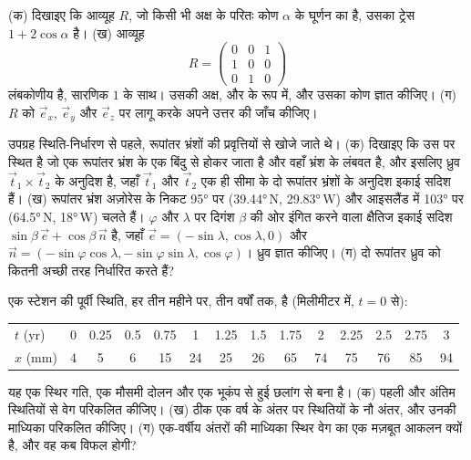 \begin{exercise}[$\star\star\star$]\label{exo:b1:plate-kinematics:10}
(क) दिखाइए कि आव्यूह $R$, जो किसी भी अक्ष के परितः कोण $\alpha$ के घूर्णन का है, उसका ट्रेस $1 + 2\cos\alpha$ है। (ख) आव्यूह
\[
  R = \begin{pmatrix} 0 & 0 & 1\\ 1 & 0 & 0\\ 0 & 1 & 0\end{pmatrix}
\]
लंबकोणीय है, सारणिक $1$ के साथ। उसकी अक्ष,  और  के रूप में, और उसका कोण ज्ञात कीजिए। (ग) $R$ को $\vec e_x$, $\vec e_y$
और $\vec e_z$ पर लागू करके अपने उत्तर की जाँच कीजिए।
\end{exercise}

\begin{exercise}[$\star\star\star$]\label{exo:b1:plate-kinematics:11}
उपग्रह स्थिति-निर्धारण से पहले,  रूपांतर भ्रंशों की प्रवृत्तियों से खोजे जाते थे। (क) दिखाइए कि  उस  पर स्थित है जो एक रूपांतर भ्रंश के एक बिंदु से होकर जाता है और वहाँ भ्रंश के लंबवत है, और इसलिए ध्रुव $\vec t_1\times\vec t_2$ के अनुदिश है, जहाँ $\vec t_1$ और $\vec t_2$ एक ही सीमा के दो रूपांतर भ्रंशों के अनुदिश इकाई सदिश हैं। (ख) रूपांतर भ्रंश अज़ोरेस  के निकट \ang{95} पर (\ang{39.44}\,N, \ang{29.83}\,W) और आइसलैंड में \ang{103} पर (\ang{64.5}\,N, \ang{18}\,W) चलते हैं।  $\varphi$ और  $\lambda$ पर दिगंश $\beta$ की ओर इंगित करने वाला क्षैतिज इकाई सदिश $\sin\beta\,\vec e +
\cos\beta\,\vec n$ है, जहाँ $\vec e = (-\sin\lambda, \cos\lambda, 0)$ और $\vec n =
(-\sin\varphi\cos\lambda, -\sin\varphi\sin\lambda, \cos\varphi)$। ध्रुव ज्ञात कीजिए। (ग) दो रूपांतर ध्रुव को कितनी अच्छी तरह निर्धारित करते हैं?
\end{exercise}

\begin{exercise}[$\star\star\star$]\label{exo:b1:plate-kinematics:12}
एक स्टेशन की पूर्वी स्थिति, हर तीन महीने पर, तीन वर्षों तक, है (मिलीमीटर में, $t = 0$ से):
\begin{center}\small
\begin{tabular}{l*{13}{c}}
\hline
$t$ (yr) & 0 & 0.25 & 0.5 & 0.75 & 1 & 1.25 & 1.5 & 1.75 & 2 & 2.25 & 2.5 & 2.75 & 3\\
$x$ (mm) & 4 & 5 & 6 & 15 & 24 & 25 & 26 & 65 & 74 & 75 & 76 & 85 & 94\\
\hline
\end{tabular}
\end{center}
यह एक स्थिर गति, एक मौसमी दोलन और एक भूकंप से हुई छलांग से बना है। (क) पहली और अंतिम स्थितियों से वेग परिकलित कीजिए। (ख) ठीक एक वर्ष के अंतर पर स्थितियों के नौ अंतर, और उनकी माध्यिका परिकलित कीजिए। (ग) एक-वर्षीय अंतरों की माध्यिका स्थिर वेग का एक मज़बूत आकलन क्यों है, और वह कब विफल होगी?
\end{exercise}

